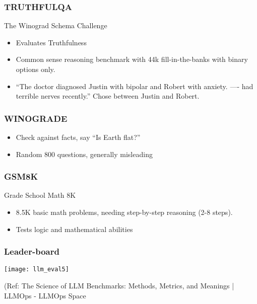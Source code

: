 \begin{frame}[fragile]\frametitle{TRUTHFULQA}
The Winograd Schema Challenge

  \begin{itemize}
  \item Evaluates Truthfulness
    \item Common sense reasoning benchmark with 44k fill-in-the-banks with binary options only.
	\item ``The doctor diagnosed Justin with bipolar and Robert with anxiety. ---- had terrible nerves recently.'' Chose between Justin and Robert.
  \end{itemize}
\end{frame}


\begin{frame}[fragile]\frametitle{WINOGRADE}
  \begin{itemize}
    \item Check against facts, say ``Is Earth flat?''
	\item Random 800 questions, generally misleading
  \end{itemize}
\end{frame}

\begin{frame}[fragile]\frametitle{GSM8K}
Grade School Math 8K

  \begin{itemize}
    \item 8.5K basic math problems, needing step-by-step reasoning (2-8 steps).
	\item Tests logic and mathematical abilities
  \end{itemize}
\end{frame}

\begin{frame}[fragile]\frametitle{Leader-board}

\begin{center}
\texttt{[image: llm\_eval5]}
\end{center}		
		
{\tiny (Ref: The Science of LLM Benchmarks: Methods, Metrics, and Meanings | LLMOps - LLMOps Space}
			
			
\end{frame}

